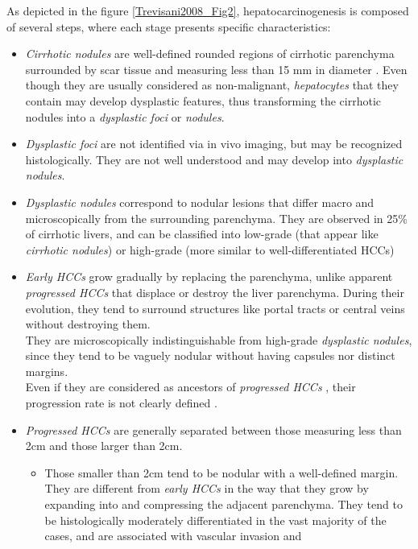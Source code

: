 \documentclass[]{article}
\begin{document}
As depicted in the figure \ref{Trevisani2008_Fig2}, hepatocarcinogenesis is composed of
several steps, where each stage presents specific characteristics:
\begin{itemize}
\item \emph{Cirrhotic nodules} are well-defined rounded regions of cirrhotic
  parenchyma surrounded by scar tissue and measuring less than 15 mm in
  diameter \cite{Zimmermann1995}. Even though they are
  usually considered as non-malignant, \emph{hepatocytes} that they
  contain may develop dysplastic features, thus transforming the
  cirrhotic nodules into a \emph{dysplastic foci} or \emph{nodules}.
\item \emph{Dysplastic foci} are not identified via in vivo imaging, but may
  be recognized histologically. They are not well understood and may
  develop into \emph{dysplastic nodules}.
\item \emph{Dysplastic nodules} correspond to nodular lesions that differ
  macro and microscopically from the surrounding parenchyma. They are
  observed in 25\% of cirrhotic livers, and can be classified into
  low-grade (that appear like \emph{cirrhotic nodules}) or high-grade (more
  similar to well-differentiated HCCs)
\item \emph{Early HCCs} grow gradually by replacing the parenchyma, unlike
  apparent \emph{progressed HCCs} that displace or destroy the liver
  parenchyma. During their evolution, they tend to surround structures
  like portal tracts or central veins without destroying them.\\
  They are microscopically indistinguishable from high-grade \emph{dysplastic
  nodules}, since they tend to be vaguely nodular without having capsules
  nor distinct margins.\\
  Even if they are considered as ancestors of \emph{progressed HCCs} \cite{Park2011}, their progression rate is not
  clearly defined \cite{Khalili2011}.
\item \emph{Progressed HCCs} are generally separated between those measuring
  less than 2cm and those larger than 2cm.
  \begin{itemize}
  \item Those smaller than 2cm tend to be nodular with a well-defined
    margin. They are different from \emph{early HCCs} in the way that
    they grow by expanding into and compressing the adjacent parenchyma.
    They tend to be histologically moderately differentiated in the vast
    majority of the cases, and are associated with vascular invasion and

\end{itemize}
\end{itemize}
\end{document}
